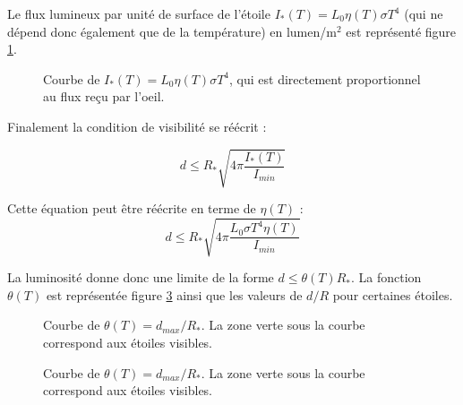 \documentclass[11pt]{article} %
\begin{document}
Le flux lumineux par unité de surface de l'étoile $I_*(T) = L_0 \eta(T) \sigma T^4$ (qui ne dépend donc également que de la température) en lumen/m$^2$ est représenté figure \ref{fig:eta_t4}. 

\begin{figure}[H]
\centering
  \caption{Courbe de $I_*(T) = L_0 \eta(T) \sigma T^4$, qui est directement proportionnel au flux reçu par l'oeil.
\label{fig:eta_t4}}

\end{figure}

Finalement la condition de visibilité se réécrit :

\begin{equation}
 d \leq R_{*} \sqrt{4\pi\dfrac{I_*(T)}{I_{min}}}
\end{equation}

Cette équation peut être réécrite en terme de $\eta(T)$ :
\begin{equation}
 d \leq R_{*} \sqrt{4\pi\dfrac{L_0 \sigma T^4 \eta(T)}{I_{min}}}
\end{equation}

La luminosité donne donc une limite de la forme $d \leq \theta (T) R_*$. La fonction $\theta(T)$ est représentée figure \ref{fig:theta} ainsi que les valeurs de $d/R$ pour certaines étoiles. 

\begin{figure}[H]
\centering
  \caption{Courbe de $\theta(T) =  d_{max}/R_*$. La zone verte sous la courbe correspond aux étoiles visibles.  
\label{fig:theta}}

\end{figure}


\begin{figure}[H]
\centering
  \caption{Courbe de $\theta(T) =  d_{max}/R_* $. La zone verte sous la courbe correspond aux étoiles visibles.  
\label{fig:theta}}

\end{figure}

%
%
\end{document}
